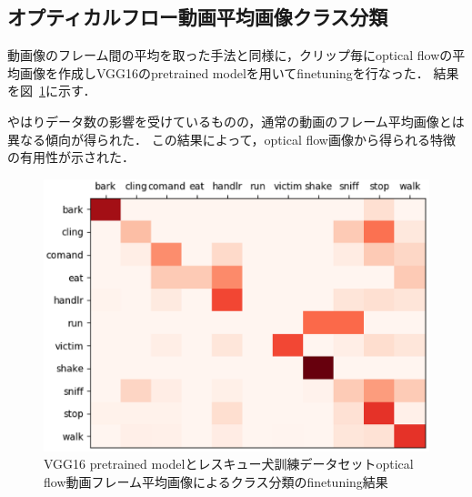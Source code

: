\subsection{オプティカルフロー動画平均画像クラス分類}
動画像のフレーム間の平均を取った手法と同様に，クリップ毎にoptical flowの平均画像を作成しVGG16のpretrained modelを用いてfinetuningを行なった．
結果を図~\ref{sub_optresque_res}に示す．

やはりデータ数の影響を受けているものの，通常の動画のフレーム平均画像とは異なる傾向が得られた．
この結果によって，optical flow画像から得られる特徴の有用性が示された．
\begin{figure}[htbp]
  \begin{center}
    \includegraphics[scale=0.5]{./Figures/resque_optmean_result.eps}
    \caption{VGG16 pretrained modelとレスキュー犬訓練データセットoptical flow動画フレーム平均画像によるクラス分類のfinetuning結果}
    \label{sub_optresque_res}
  \end{center}
\end{figure}
